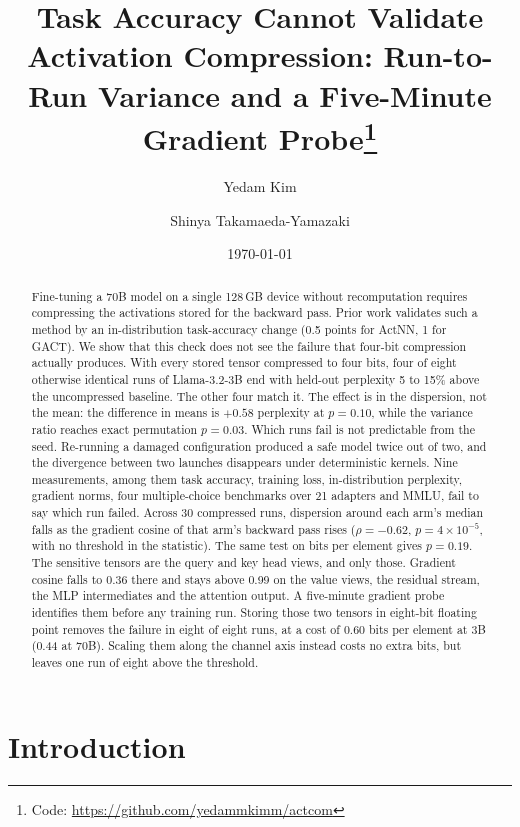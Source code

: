 \documentclass[11pt,letterpaper]{article}
\title{\Large\textbf{Task Accuracy Cannot Validate Activation Compression: Run-to-Run Variance and a Five-Minute Gradient Probe}\thanks{Code: \url{https://github.com/yedammkimm/actcom}}}
\author[1]{Yedam Kim}
\author[2]{Shinya Takamaeda-Yamazaki}
\affil[1]{Sorbonne University}
\affil[2]{CASYS Lab, The University of Tokyo}
\date{\today}
\begin{document}
  \maketitle

\begin{abstract}
Fine-tuning a 70B model on a single 128\,GB device without recomputation requires compressing the activations stored for the backward pass. Prior work validates such a method by an in-distribution task-accuracy change (0.5 points for ActNN, 1 for GACT). We show that this check does not see the failure that four-bit compression actually produces. With every stored tensor compressed to four bits, four of eight otherwise identical runs of Llama-3.2-3B end with held-out perplexity 5 to 15\% above the uncompressed baseline. The other four match it. The effect is in the dispersion, not the mean: the difference in means is $+0.58$ perplexity at $p = 0.10$, while the variance ratio reaches exact permutation $p = 0.03$. Which runs fail is not predictable from the seed. Re-running a damaged configuration produced a safe model twice out of two, and the divergence between two launches disappears under deterministic kernels. Nine measurements, among them task accuracy, training loss, in-distribution perplexity, gradient norms, four multiple-choice benchmarks over 21 adapters and MMLU, fail to say which run failed. Across 30 compressed runs, dispersion around each arm's median falls as the gradient cosine of that arm's backward pass rises ($\rho = -0.62$, $p = 4 \times 10^{-5}$, with no threshold in the statistic). The same test on bits per element gives $p = 0.19$. The sensitive tensors are the query and key head views, and only those. Gradient cosine falls to 0.36 there and stays above 0.99 on the value views, the residual stream, the MLP intermediates and the attention output. A five-minute gradient probe identifies them before any training run. Storing those two tensors in eight-bit floating point removes the failure in eight of eight runs, at a cost of 0.60 bits per element at 3B (0.44 at 70B). Scaling them along the channel axis instead costs no extra bits, but leaves one run of eight above the threshold.
\end{abstract}

  \vspace{0.8cm}


\section{Introduction}
\label{sec:intro}
\end{document}
